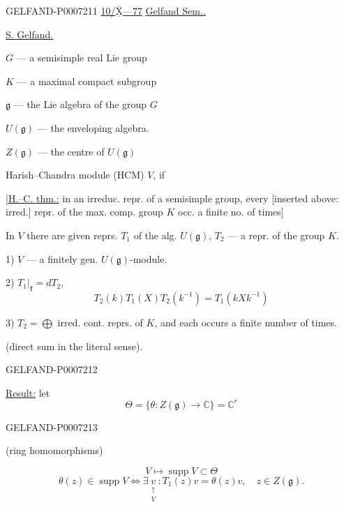 \begin{GelfandAdjacentEvidence}{GELFAND-P000721}{1}
\underline{10/\(\overline{\underline{\mathrm X}}\)---77}
\qquad\underline{\underline{Gelfand Sem..}}

\underline{S. Gelfand.}

\(G\) --- a semisimple real Lie group

\(K\) --- a maximal compact subgroup

\(\mathfrak g\) --- the Lie algebra of the group \(G\)

\(U(\mathfrak g)\) --- the enveloping algebra.

\(Z(\mathfrak g)\) --- the centre of \(U(\mathfrak g)\)

Harish–Chandra module (HCM) \(V\), if

[\underline{H.–C. thm.:} in an irreduc. repr. of a semisimple group, every
[inserted above: irred.] repr. of the max. comp. group \(K\) occ. a finite no. of times]

In \(V\) there are given reprs. \(T_1\) of the alg. \(U(\mathfrak g)\), \(T_2\) --- a repr. of the group \(K\).

1) \(V\) --- a finitely gen. \(U(\mathfrak g)\)-module.

2) \(\left.T_1\right|_{\mathfrak k}=dT_2\),
\[
T_2(k)T_1(X)T_2(k^{-1})=T_1(kXk^{-1})
\]

3) \(T_2=\bigoplus\) irred. cont. reprs. of \(K\), and each occurs a finite number of times.

(direct sum in the literal sense).

\end{GelfandAdjacentEvidence}
\begin{GelfandAdjacentEvidence}{GELFAND-P000721}{2}

\underline{Result:} let
\[
\Theta=\{\theta:Z(\mathfrak g)\to\mathbb C\}=\mathbb C^{r}
\]
\end{GelfandAdjacentEvidence}
\begin{GelfandAdjacentEvidence}{GELFAND-P000721}{3}

(ring homomorphisms)

\[
V\mapsto\operatorname{supp}V\subset\Theta
\]
\[
\theta(z)\in\operatorname{supp}V
\Longleftrightarrow\exists\underset{\substack{\uparrow\\V}}{v}:
T_1(z)v=\theta(z)v,\quad z\in Z(\mathfrak g).
\]
\end{GelfandAdjacentEvidence}
